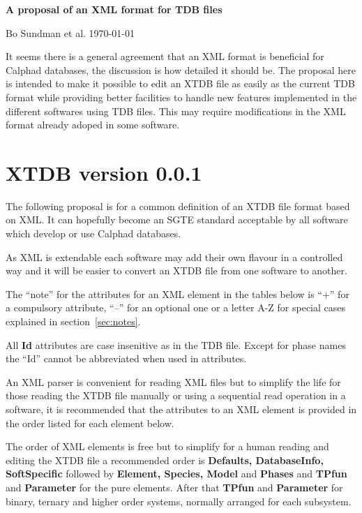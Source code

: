 \documentclass{article}
\begin{document}
\begin{center}

  {\Large \bf A proposal of an XML format for TDB files}

  Bo Sundman et al. \today
\end{center}

It seems there is a general agreement that an XML format is beneficial
for Calphad databases, the discussion is how detailed it should be.
The proposal here is intended to make it possible to edit an XTDB file
as easily as the current TDB format while providing better facilities
to handle new features implemented in the different softwares using
TDB files.  This may require modifications in the XML format already
adoped in some software.

\section{XTDB version 0.0.1}

The following proposal is for a common definition of an XTDB file
format based on XML.  It can hopefully become an SGTE standard
acceptable by all software which develop or use Calphad databases.

As XML is extendable each software may add their own flavour in a
controlled way and it will be easier to convert an XTDB file from one
software to another.

The ``note'' for the attributes for an XML element in the tables below
is ``+'' for a compulsory attribute, ``--'' for an optional one or a
letter A-Z for special cases explained in section~\ref{sec:notes}.

All {\bf Id} attributes are case insenitive as in the TDB file.
Except for phase names the ``Id'' cannot be abbreviated when used in
attributes.

An XML parser is convenient for reading XML files but to simplify the
life for those reading the XTDB file manually or using a sequential
read operation in a software, it is recommended that the attributes to
an XML element is provided in the order listed for each element below.

The order of XML elements is free but to simplify for a human reading
and editing the XTDB file a recommended order is {\bf Defaults,
  DatabaseInfo, SoftSpecific} followed by {\bf Element, Species,
  Model} and {\bf Phases} and {\bf TPfun} and {\bf Parameter} for the
pure elements.  After that {\bf TPfun} and {\bf Parameter} for binary,
ternary and higher order systems, normally arranged for each
subsystem.
\end{document}
